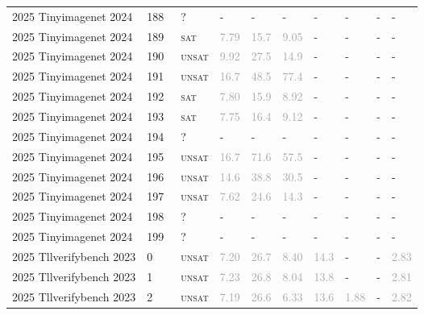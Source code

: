 \begin{center}
{\begin{longtable}{@{}llllllllll@{}}
2025 Tinyimagenet 2024 & 188 & ~? & - & - & - & - & - & - & - \\
2025 Tinyimagenet 2024 & 189 & ~\textsc{sat} & \textcolor{darkgray}{7.79} & \textcolor{darkgray}{15.7} & \textcolor{darkgray}{9.05} & - & - & - & - \\
2025 Tinyimagenet 2024 & 190 & ~\textsc{unsat} & \textcolor{darkgray}{9.92} & \textcolor{darkgray}{27.5} & \textcolor{darkgray}{14.9} & - & - & - & - \\
2025 Tinyimagenet 2024 & 191 & ~\textsc{unsat} & \textcolor{darkgray}{16.7} & \textcolor{darkgray}{48.5} & \textcolor{darkgray}{77.4} & - & - & - & - \\
2025 Tinyimagenet 2024 & 192 & ~\textsc{sat} & \textcolor{darkgray}{7.80} & \textcolor{darkgray}{15.9} & \textcolor{darkgray}{8.92} & - & - & - & - \\
2025 Tinyimagenet 2024 & 193 & ~\textsc{sat} & \textcolor{darkgray}{7.75} & \textcolor{darkgray}{16.4} & \textcolor{darkgray}{9.12} & - & - & - & - \\
2025 Tinyimagenet 2024 & 194 & ~? & - & - & - & - & - & - & - \\
2025 Tinyimagenet 2024 & 195 & ~\textsc{unsat} & \textcolor{darkgray}{16.7} & \textcolor{darkgray}{71.6} & \textcolor{darkgray}{57.5} & - & - & - & - \\
2025 Tinyimagenet 2024 & 196 & ~\textsc{unsat} & \textcolor{darkgray}{14.6} & \textcolor{darkgray}{38.8} & \textcolor{darkgray}{30.5} & - & - & - & - \\
2025 Tinyimagenet 2024 & 197 & ~\textsc{unsat} & \textcolor{darkgray}{7.62} & \textcolor{darkgray}{24.6} & \textcolor{darkgray}{14.3} & - & - & - & - \\
2025 Tinyimagenet 2024 & 198 & ~? & - & - & - & - & - & - & - \\
2025 Tinyimagenet 2024 & 199 & ~? & - & - & - & - & - & - & - \\
\midrule
2025 Tllverifybench 2023 & 0 & ~\textsc{unsat} & \textcolor{darkgray}{7.20} & \textcolor{darkgray}{26.7} & \textcolor{darkgray}{8.40} & \textcolor{darkgray}{14.3} & - & - & \textcolor{darkgray}{2.83} \\
2025 Tllverifybench 2023 & 1 & ~\textsc{unsat} & \textcolor{darkgray}{7.23} & \textcolor{darkgray}{26.8} & \textcolor{darkgray}{8.04} & \textcolor{darkgray}{13.8} & - & - & \textcolor{darkgray}{2.81} \\
2025 Tllverifybench 2023 & 2 & ~\textsc{unsat} & \textcolor{darkgray}{7.19} & \textcolor{darkgray}{26.6} & \textcolor{darkgray}{6.33} & \textcolor{darkgray}{13.6} & \textcolor{darkgray}{1.88} & - & \textcolor{darkgray}{2.82} \\

\end{longtable}}
\end{center}
